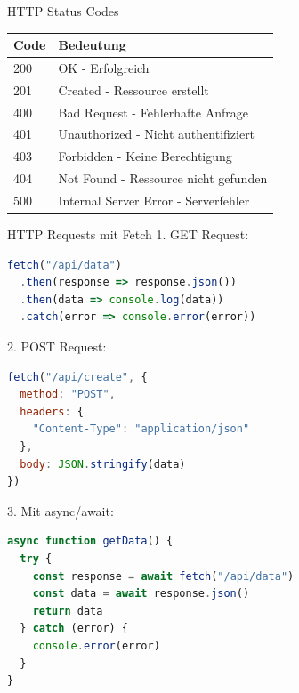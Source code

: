 \begin{theorem}{HTTP Status Codes}
    \begin{center}
    \begin{tabular}{|l|l|}
    \hline
    Code & Bedeutung \\
    \hline
    200 & OK - Erfolgreich \\
    \hline
    201 & Created - Ressource erstellt \\
    \hline
    400 & Bad Request - Fehlerhafte Anfrage \\
    \hline
    401 & Unauthorized - Nicht authentifiziert \\
    \hline
    403 & Forbidden - Keine Berechtigung \\
    \hline
    404 & Not Found - Ressource nicht gefunden \\
    \hline
    500 & Internal Server Error - Serverfehler \\
    \hline
    \end{tabular}
    \end{center}
\end{theorem}

\begin{KR}{HTTP Requests mit Fetch}
1. GET Request:
\begin{lstlisting}[language=JavaScript, style=basesmol]
fetch("/api/data")
  .then(response => response.json())
  .then(data => console.log(data))
  .catch(error => console.error(error))
\end{lstlisting}

2. POST Request:
\begin{lstlisting}[language=JavaScript, style=basesmol]
fetch("/api/create", {
  method: "POST",
  headers: {
    "Content-Type": "application/json"
  },
  body: JSON.stringify(data)
})
\end{lstlisting}

3. Mit async/await:
\begin{lstlisting}[language=JavaScript, style=basesmol]
async function getData() {
  try {
    const response = await fetch("/api/data")
    const data = await response.json()
    return data
  } catch (error) {
    console.error(error)
  }
}
\end{lstlisting}
\end{KR}

